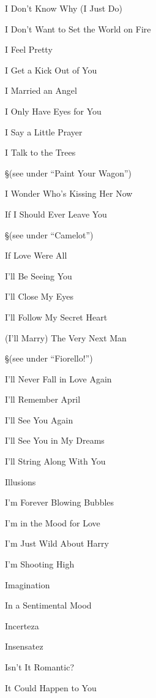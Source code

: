 \N I Don't Know Why (I Just Do)


\N I Don't Want to Set the World on Fire


\N I Feel Pretty


\N I Get a Kick Out of You


\N I Married an Angel


\N I Only Have Eyes for You


\N I Say a Little Prayer


\N I Talk to the Trees

\nobreak
\S (see under ``Paint Your Wagon'')

\N I Wonder Who's Kissing Her Now


\N If I Should Ever Leave You

\nobreak
\S (see under ``Camelot'')

\N If Love Were All


\N I'll Be Seeing You


\N I'll Close My Eyes


\N I'll Follow My Secret Heart


\N (I'll Marry) The Very Next Man

\nobreak
\S (see under ``Fiorello!'')

\N I'll Never Fall in Love Again


\N I'll Remember April


\N I'll See You Again


\N I'll See You in My Dreams


\N I'll String Along With You


\N Illusions


\N I'm Forever Blowing Bubbles


\N {}


\N I'm in the Mood for Love


\N I'm Just Wild About Harry


\N I'm Shooting High


\N Imagination


\N In a Sentimental Mood


\N Incerteza


\N Insensatez


\N Isn't It Romantic?


\N {}


\N It Could Happen to You


